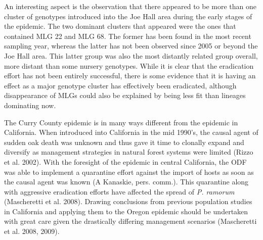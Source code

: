\documentclass[double,12pt]{beavtex}
\begin{document}
  An interesting aspect is the observation that there appeared to be more
  than one cluster of genotypes introduced into the Joe Hall area during
  the early stages of the epidemic. The two dominant clusters that
  appeared were the ones that contained MLG 22 and MLG 68. The former has
  been found in the most recent sampling year, whereas the latter has not
  been observed since 2005 or beyond the Joe Hall area. This latter group
  was also the most distantly related group overall, more distant than
  some nursery genotypes. While it is clear that the eradication effort
  has not been entirely successful, there is some evidence that it is
  having an effect as a major genotype cluster has effectively been
  eradicated, although disappearance of MLGs could also be explained by
  being less fit than lineages dominating now.
  
  The Curry County epidemic is in many ways different from the epidemic in
  California. When introduced into California in the mid 1990's, the
  causal agent of sudden oak death was unknown and thus gave it time to
  clonally expand and diversify as management strategies in natural forest
  systems were limited (Rizzo et al. 2002). With the foresight of the
  epidemic in central California, the ODF was able to implement a
  quarantine effort against the import of hosts as soon as the causal
  agent was known (A Kanaskie, pers. comm.). This quarantine along with
  aggressive eradication efforts have affected the spread of \emph{P.
  ramorum} (Mascheretti et al. 2008). Drawing conclusions from previous
  population studies in California and applying them to the Oregon
  epidemic should be undertaken with great care given the drastically
  differing management scenarios (Mascheretti et al. 2008, 2009).
  
\end{document}
